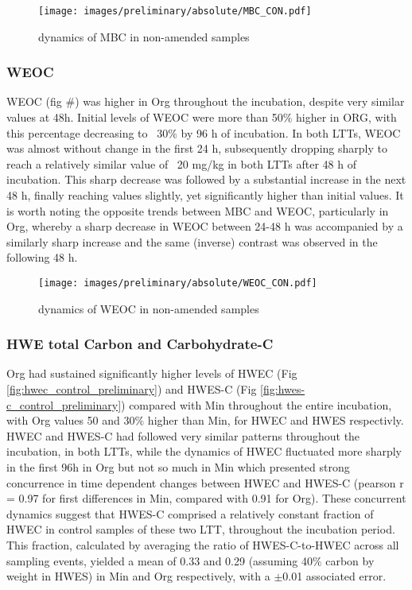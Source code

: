         \begin{figure}[H]
            \centering
            \texttt{[image: images/preliminary/absolute/MBC\_CON.pdf]}
            \caption{dynamics of MBC in non-amended samples}
            \label{fig:mbc_control_preliminary}
        \end{figure}
        
        \subsubsection{WEOC}
            
            WEOC  (fig #) was higher in Org throughout the incubation, despite very similar values at 48h. Initial levels of WEOC were more than 50$\%$ higher in ORG, with this percentage decreasing to ~30$\%$ by 96 h of incubation. In both LTTs, WEOC was almost without change in the first 24 h, subsequently dropping sharply to reach a relatively similar value of ~20 mg/kg in both LTTs after 48 h of incubation. This sharp decrease was followed by a substantial increase in the next 48 h, finally reaching values  slightly, yet significantly higher than initial values. It is worth noting the opposite trends between MBC and WEOC, particularly in  Org, whereby  a sharp decrease in WEOC between 24-48 h was accompanied by a similarly sharp increase and the same (inverse) contrast was observed in the following 48 h.
    
            \begin{figure}[H]
            \centering
            \texttt{[image: images/preliminary/absolute/WEOC\_CON.pdf]}
            \caption{dynamics of WEOC in non-amended samples}
            \label{fig:weoc_control_preliminary}
             \end{figure}
      
      
       \subsubsection{HWE total Carbon and Carbohydrate-C}
            
            Org had sustained significantly higher levels of HWEC (Fig \ref{fig:hwec_control_preliminary}) and HWES-C (Fig \ref{fig:hwes-c_control_preliminary}) compared with Min throughout the entire incubation, with Org values 50 and 30$\%$ higher than Min, for HWEC and HWES respectivly. HWEC and HWES-C had followed very similar patterns throughout the incubation, in both LTTs, while the dynamics of HWEC fluctuated more sharply in the first 96h in Org but not so much in Min which presented strong concurrence in time dependent changes between HWEC and HWES-C (pearson r = 0.97 for first differences in Min, compared with 0.91 for Org). These concurrent dynamics suggest that HWES-C comprised a relatively constant fraction of HWEC in control samples of these two LTT, throughout the incubation period. This fraction, calculated by averaging the ratio of HWES-C-to-HWEC across all sampling events, yielded a mean of 0.33 and 0.29 (assuming 40$\%$ carbon by weight in HWES) in Min and Org respectively, with a $\pm$0.01 associated error.   
        
